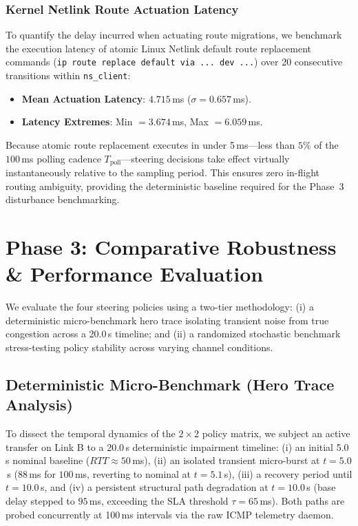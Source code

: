 \documentclass[conference]{IEEEtran}
\begin{document}
{\subsubsection{Kernel Netlink Route Actuation Latency}
To quantify the delay incurred when actuating route migrations, we benchmark the execution latency of atomic Linux Netlink default route replacement commands (\texttt{ip route replace default via ... dev ...}) over 20 consecutive transitions within \texttt{ns\_client}:
\begin{itemize}
    \item \textbf{Mean Actuation Latency}: $\mathbf{4.715}$\,ms ($\sigma = 0.657$\,ms).
    \item \textbf{Latency Extremes}: Min $= 3.674$\,ms, Max $= 6.059$\,ms.
\end{itemize}
Because atomic route replacement executes in under 5\,ms---less than $5\%$ of the $100$\,ms polling cadence $T_{\text{poll}}$---steering decisions take effect virtually instantaneously relative to the sampling period. This ensures zero in-flight routing ambiguity, providing the deterministic baseline required for the Phase~3 disturbance benchmarking.
}

\section{Phase 3: Comparative Robustness \& Performance Evaluation}

We evaluate the four steering policies using a two-tier methodology: (i) a deterministic micro-benchmark hero trace isolating transient noise from true congestion across a 20.0\,s timeline; and (ii) a randomized stochastic benchmark stress-testing policy stability across varying channel conditions.

\subsection{Deterministic Micro-Benchmark (Hero Trace Analysis)}
To dissect the temporal dynamics of the $2 \times 2$ policy matrix, we subject an active transfer on Link B to a 20.0\,s deterministic impairment timeline: (i) an initial 5.0\,s nominal baseline ($RTT \approx 50$\,ms), (ii) an isolated transient micro-burst at $t = 5.0$\,s ($88$\,ms for $100$\,ms, reverting to nominal at $t = 5.1$\,s), (iii) a recovery period until $t = 10.0$\,s, and (iv) a persistent structural path degradation at $t = 10.0$\,s (base delay stepped to $95$\,ms, exceeding the SLA threshold $\tau = 65$\,ms). Both paths are probed concurrently at 100\,ms intervals via the raw ICMP telemetry daemon.
\end{document}
